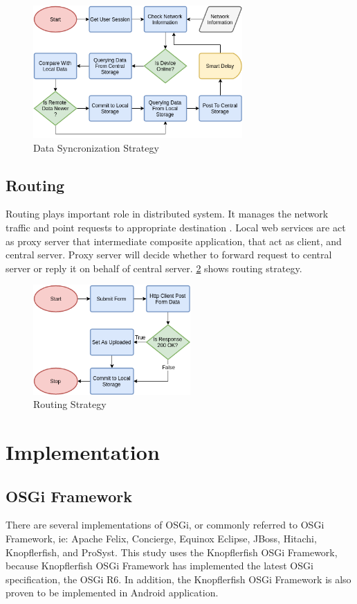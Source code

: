 \documentclass[conference]{IEEEtran}
\begin{document}
\begin{figure}
    \centering
    \includegraphics[width=8cm]{../Images/data-sync-flowchart}
    \caption{Data Syncronization Strategy}
    \label{fig:data-sync-flowchart}
\end{figure}




\subsection{Routing}
Routing plays important role in distributed system. It manages the network traffic and point requests to appropriate destination \cite{takdir_multi-layer_2014}. Local web services are act as proxy server that intermediate composite application, that act as client, and central server. Proxy server will decide whether to forward request to central server or reply it on behalf of central server. \figurename{\ref{fig:routing-flowchart}} shows routing strategy.

\begin{figure}
    \centering
    \includegraphics[width=6cm]{../Images/routing-flowchart}
    \caption{Routing Strategy}
    \label{fig:routing-flowchart}
\end{figure}



\section{Implementation}


\subsection{OSGi Framework}
There are several implementations of OSGi, or commonly referred to OSGi Framework, ie: Apache Felix, Concierge, Equinox Eclipse, JBoss, Hitachi, Knopflerfish, and ProSyst. This study uses the Knopflerfish OSGi Framework, because Knopflerfish OSGi Framework has implemented the latest OSGi specification, the OSGi R6. In addition, the Knopflerfish OSGi Framework is also proven to be implemented in Android application.
\end{document}
